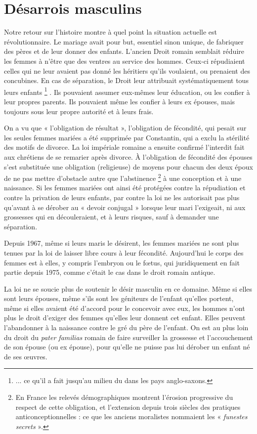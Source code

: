 
\chapter{Désarrois masculins}


 Notre retour sur l'histoire montre à quel point la situation actuelle est révolutionnaire. Le mariage avait pour but, essentiel sinon unique, de fabriquer des pères et de leur donner des enfants. L'ancien Droit romain semblait réduire les femmes à n'être que des ventres au service des hommes. Ceux-ci répudiaient celles qui ne leur avaient pas donné les héritiers qu'ils voulaient, ou prenaient des concubines. En cas de séparation, le Droit leur attribuait systématiquement tous leurs enfants%
\footnote{... ce qu'il a fait jusqu'au milieu du  dans les pays anglo-saxons.}%
. Ils pouvaient assumer eux-mêmes leur éducation, ou les confier à leur propres parents. Ils pouvaient même les confier à leurs ex épouses, mais toujours sous leur propre autorité et à leurs frais.

 On a vu que « l'obligation de résultat », l'obligation de fécondité, qui pesait sur les seules femmes mariées a été supprimée par Constantin, qui a exclu la stérilité des motifs de divorce. La loi impériale romaine a ensuite confirmé l'interdit fait aux chrétiens de se remarier après divorce. À l'obligation de fécondité des épouses s'est substituée une obligation (religieuse) de moyens pour chacun des deux époux de ne pas mettre d'obstacle autre que l'abstinence%
\footnote{En France les relevés démographiques montrent l'érosion progressive du respect de cette obligation, et l'extension depuis trois siècles des pratiques anticonceptionnelles : ce que les anciens moralistes nommaient les « \emph{funestes secrets} ».} 
à une conception et à une naissance. Si les femmes mariées ont ainsi été protégées contre la répudiation et contre la privation de leurs enfants, par contre la loi ne les autorisait pas plus qu'avant à se dérober au « devoir conjugal » lorsque leur mari l'exigeait, ni aux grossesses qui en découleraient, et à leurs risques, sauf à demander une séparation. 

 Depuis 1967, même si leurs maris le désirent, les femmes mariées ne sont plus tenues par la loi de laisser libre cours à leur fécondité. Aujourd'hui le corps des femmes est à elles, y compris l'embryon ou le fœtus, qui juridiquement en fait partie depuis 1975, comme c'était le cas dans le droit romain antique. 

 La loi ne se soucie plus de soutenir le désir masculin en ce domaine. Même si elles sont leurs épouses, même s'ils sont les géniteurs de l'enfant qu'elles portent, même si elles avaient été d'accord pour le concevoir avec eux, les hommes n'ont plus le droit d'exiger des femmes qu'elles leur donnent cet enfant. Elles peuvent l'abandonner à la naissance contre le gré du père de l'enfant. On est au plus loin du droit du \emph{pater familias} romain de faire surveiller la grossesse et l'accouchement de son épouse (ou ex épouse), pour qu'elle ne puisse pas lui dérober un enfant né de ses œuvres.

